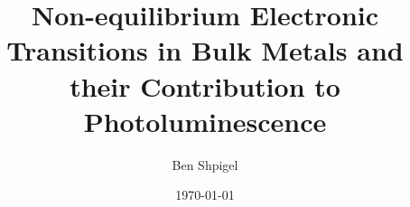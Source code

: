 \documentclass[11pt]{article}
\title{Non-equilibrium Electronic Transitions in Bulk Metals and their Contribution to Photoluminescence}
\author{Ben Shpigel}
\date{\today}
\numberwithin{equation}{section}
\begin{document}
\maketitle



\tableofcontents
\newpage






\appendix









\nocite{*}


\end{document}
